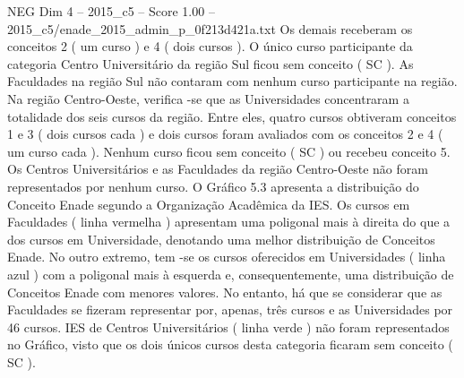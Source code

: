 \begin{textsample}{NEG Dim 4 – 2015\_c5 – Score 1.00 – 2015\_c5/enade\_2015\_admin\_p\_0f213d421a.txt}
Os demais receberam os conceitos 2 ( um curso ) e 4 ( dois cursos ).
O único curso participante da categoria Centro Universitário da região Sul ficou sem conceito ( SC ).
As Faculdades na região Sul não contaram com nenhum curso participante na região.
Na região Centro-Oeste, verifica -se que as Universidades concentraram a totalidade dos seis cursos da região.
Entre eles, quatro cursos obtiveram conceitos 1 e 3 ( dois cursos cada ) e dois cursos foram avaliados com os conceitos 2 e 4 ( um curso cada ).
Nenhum curso ficou sem conceito ( SC ) ou recebeu conceito 5.
Os Centros Universitários e as Faculdades da região Centro-Oeste não foram representados por nenhum curso.
O Gráfico 5.3 apresenta a distribuição do Conceito Enade segundo a Organização Acadêmica da IES.
Os cursos em Faculdades ( linha vermelha ) apresentam uma poligonal mais à direita do que a dos cursos em Universidade, denotando uma melhor distribuição de Conceitos Enade.
No outro extremo, tem -se os cursos oferecidos em Universidades ( linha azul ) com a poligonal mais à esquerda e, consequentemente, uma distribuição de Conceitos Enade com menores valores.
No entanto, há que se considerar que as Faculdades se fizeram representar por, apenas, três cursos e as Universidades por 46 cursos.
IES de Centros Universitários ( linha verde ) não foram representados no Gráfico, visto que os dois únicos cursos desta categoria ficaram sem conceito ( SC ).

\end{textsample}
